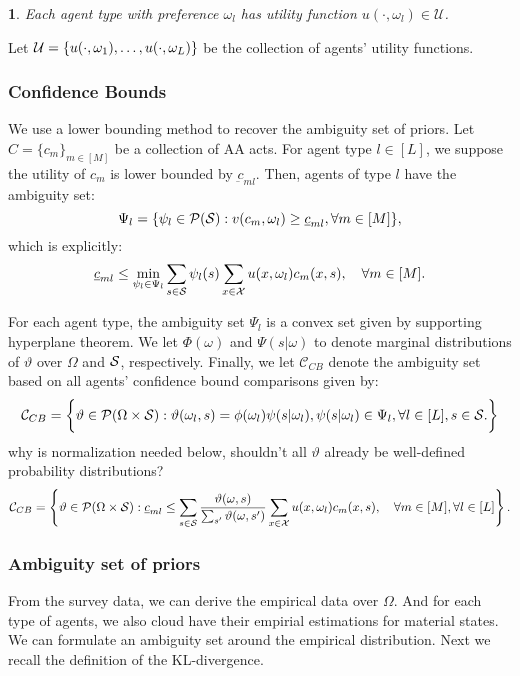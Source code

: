 \documentclass[11pt,oneside]{article}
\theoremstyle{plain}
\theoremstyle{plain}
\theoremstyle{plain}
\theoremstyle{plain}
\theoremstyle{plain}
\newtheorem{assumption}[thm]{\protect\assumptionname}
\theoremstyle{definition}
\theoremstyle{definition}
\theoremstyle{remark}
\theoremstyle{plain}
\providecommand{\assumptionname}{Assumption}
\newcommand{\mcs}{{\cal S}}
\newcommand{\mcx}{{\cal X}}
\newcommand{\wh}[1]{{\color{blue} #1     }}
\begin{document}
\begin{assumption}
Each agent type with preference $\omega_l$ has utility function $u(\cdot,\omega_l) \in \mathcal{U}$.
\end{assumption}

Let ${\cal U} = \{ u(\cdot, \omega_1),\dots, u(\cdot,\omega_L)\}$ be the collection of agents' utility functions.

\subsubsection{Confidence Bounds}

We use a lower bounding method to recover the ambiguity set of priors.
Let $C = \{ {c_m} \}_{m \in [M]}$ be a collection of AA acts.
For agent type $l \in [L]$, we suppose the utility of $c_m$ is lower bounded by $\underbar{c}_{ml}$.
Then, agents of type $l$ have the ambiguity set:
$$
\Psi_l =\{ \psi_l \in {\cal P}(\mcs): v(c_m,\omega_l) \geq \underline{c}_{ml}, \forall m \in [M] \},
$$
which is explicitly:
\begin{equation}
    \underline{c}_{ml} \leq \min_{\psi_l \in \Psi_l} \sum_{s\in \mcs}\psi_l(s) \sum_{x \in \mcx} u(x,\omega_l)c_m(x,s), \quad \forall m \in [M].
\end{equation}

For each agent type, the ambiguity set $\Psi_l$ is a convex set given by supporting hyperplane theorem.
We let $\Phi(\omega)$ and $\Psi(s|\omega)$ to denote marginal distributions of $\vartheta$ over $\Omega$ and $\mcs$, respectively. 
Finally, we let $\mathcal{C}_{CB}$ denote the ambiguity set based on all agents' confidence bound comparisons given by:
\[
\mathcal{C}_{CB} = \bigg\{ \vartheta \in \mathcal{P}(\Omega \times \mcs): \vartheta(\omega_l,s) = \phi(\omega_l) \psi(s|\omega_l), \psi(s|\omega_l) \in \Psi_l, \forall l \in [L], s\in\mcs.\bigg\}
\]
\wh{why is normalization needed below, shouldn't all $\vartheta$ already be well-defined probability distributions?}
$$
\mathcal{C}_{CB} = \left\{ \vartheta \in \mathcal{P}(\Omega \times \mcs):  \underline{c}_{ml} \leq  \sum_{s\in \mcs} \frac{\vartheta(\omega,s)}{\sum_{s'}\vartheta(\omega,s')} \sum_{x \in \mcx} u(x,\omega_l)c_m(x,s), \quad \forall m \in [M] , \forall l \in [L]\right\}.
$$


\subsubsection{Ambiguity set of priors}
From the survey data, we can derive the empirical data over $\Omega$. And for each type of agents, we also cloud have their empirial estimations for material states. We can formulate an ambiguity set around the empirical distribution. Next we recall the definition of the KL-divergence.
\end{document}
